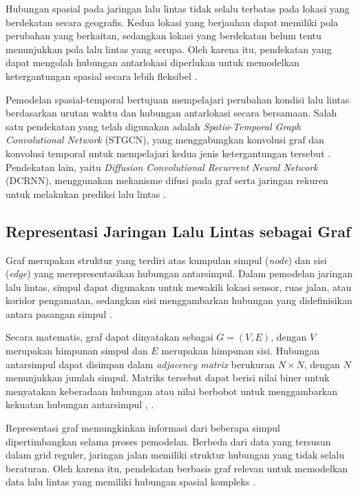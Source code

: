 Hubungan spasial pada jaringan lalu lintas tidak selalu terbatas pada lokasi yang berdekatan secara geografis. Kedua lokasi yang berjauhan dapat memiliki pola perubahan yang berkaitan, sedangkan lokasi yang berdekatan belum tentu menunjukkan pola lalu lintas yang serupa. Oleh karena itu, pendekatan yang dapat mengolah hubungan antarlokasi diperlukan untuk memodelkan ketergantungan spasial secara lebih fleksibel \cite{jiang2022gnntraffic}.

Pemodelan spasial-temporal bertujuan mempelajari perubahan kondisi lalu lintas berdasarkan urutan waktu dan hubungan antarlokasi secara bersamaan. Salah satu pendekatan yang telah digunakan adalah \textit{Spatio-Temporal Graph Convolutional Network} (STGCN), yang menggabungkan konvolusi graf dan konvolusi temporal untuk mempelajari kedua jenis ketergantungan tersebut \cite{yu2018stgcn}. Pendekatan lain, yaitu \textit{Diffusion Convolutional Recurrent Neural Network} (DCRNN), menggunakan mekanisme difusi pada graf serta jaringan rekuren untuk melakukan prediksi lalu lintas \cite{li2018dcrnn}.

\subsection{Representasi Jaringan Lalu Lintas sebagai Graf}
\label{subsec:graph}
\label{subsec:traffic_graph}

Graf merupakan struktur yang terdiri atas kumpulan simpul (\textit{node}) dan sisi (\textit{edge}) yang merepresentasikan hubungan antarsimpul. Dalam pemodelan jaringan lalu lintas, simpul dapat digunakan untuk mewakili lokasi sensor, ruas jalan, atau koridor pengamatan, sedangkan sisi menggambarkan hubungan yang didefinisikan antara pasangan simpul \cite{yu2018stgcn}.

Secara matematis, graf dapat dinyatakan sebagai $G=(V,E)$, dengan $V$ merupakan himpunan simpul dan $E$ merupakan himpunan sisi. Hubungan antarsimpul dapat disimpan dalam \textit{adjacency matrix} berukuran $N\times N$, dengan $N$ menunjukkan jumlah simpul. Matriks tersebut dapat berisi nilai biner untuk menyatakan keberadaan hubungan atau nilai berbobot untuk menggambarkan kekuatan hubungan antarsimpul \cite{yu2018stgcn}, \cite{li2018dcrnn}.

Representasi graf memungkinkan informasi dari beberapa simpul dipertimbangkan selama proses pemodelan. Berbeda dari data yang tersusun dalam grid reguler, jaringan jalan memiliki struktur hubungan yang tidak selalu beraturan. Oleh karena itu, pendekatan berbasis graf relevan untuk memodelkan data lalu lintas yang memiliki hubungan spasial kompleks \cite{yu2018stgcn}.

